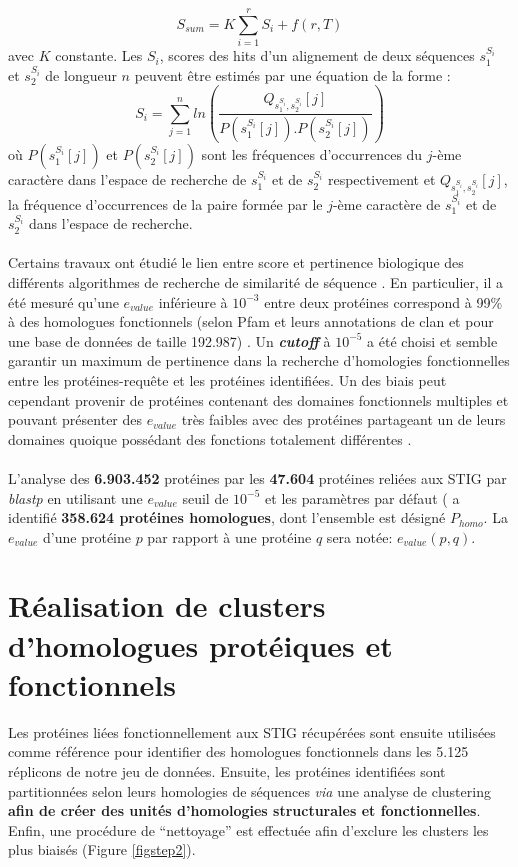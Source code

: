 	\begin{equation}
		S_{sum}=K\sum_{i=1}^{r}S_{i}+f(r,T)
	\end{equation}
avec $K$ constante. Les $S_{i}$, scores des hits d'un alignement de deux séquences $s^{S_{i}}_{1}$ et $s^{S_{i}}_{2}$ de longueur $n$ peuvent être estimés par une équation de la forme  \citep{korf2003blast}:
	\begin{equation}
		S_{i}=\sum_{j=1}^{n} ln\left(\frac{Q_{s^{S_{i}}_{1},s^{S_{i}}_{2}}[j]}{P(s^{S_{i}}_{1}[j]).P(s^{S_{i}}_{2}[j])}\right)
	\end{equation}
où $P(s^{S_{i}}_{1}[j])$ et $P(s^{S_{i}}_{2}[j])$ sont les fréquences d’occurrences du $j$-ème caractère dans l'espace de recherche de  $s^{S_{i}}_{1}$ et de $s^{S_{i}}_{2}$ respectivement et  $Q_{s^{S_{i}}_{1},s^{S_{i}}_{2}}[j]$, la fréquence d'occurrences de la paire formée par le $j$-ème caractère de $s^{S_{i}}_{1}$ et de $s^{S_{i}}_{2}$ dans l'espace de recherche. \\
\\
	Certains travaux ont étudié le lien entre score et pertinence biologique des différents algorithmes de recherche de similarité de séquence \citep{Eddy2011}. En particulier, il a été mesuré qu'une $e_{value}$ inférieure à $10^{-3}$ entre deux protéines correspond à 99\% à des homologues fonctionnels (selon Pfam et leurs annotations de clan et pour une base de données de taille 192.987) \citep{Boekhorst2007}. Un \textbf{\textit{cutoff}} à $10^{-5}$ a été choisi et semble garantir un maximum de pertinence dans la recherche d'homologies fonctionnelles entre les protéines-requête et les protéines identifiées. Un des biais peut cependant provenir de protéines contenant des domaines fonctionnels multiples et pouvant présenter des $e_{value}$ très faibles avec des protéines partageant un de leurs domaines quoique possédant des fonctions totalement différentes \citep{Song2007}.\\ 
	\\
L'analyse des \textbf{6.903.452} protéines par les \textbf{47.604} protéines reliées aux STIG par \textit{blastp} en utilisant une $e_{value}$ seuil de $10^{-5}$ et les paramètres par défaut (\citep{Camacho2009} a identifié \textbf{358.624 protéines homologues}, dont l'ensemble est désigné \textbf{$P_{homo}$}. La $e_{value}$ d'une protéine $p$ par rapport à une protéine $q$ sera notée: $e_{value}(p,q)$.



\section{Réalisation de clusters d'homologues protéiques et fonctionnels}\label{parclusterhomo}
	Les protéines liées fonctionnellement aux STIG récupérées sont ensuite utilisées comme référence pour identifier des homologues fonctionnels dans les 5.125 réplicons de notre jeu de données. Ensuite, les protéines identifiées sont partitionnées selon leurs homologies de séquences \textit{via} une analyse de clustering \textbf{afin de créer des unités d'homologies structurales et fonctionnelles}. Enfin, une procédure de “nettoyage” est effectuée afin d'exclure les clusters les plus biaisés (Figure \ref{figstep2}). 
  
